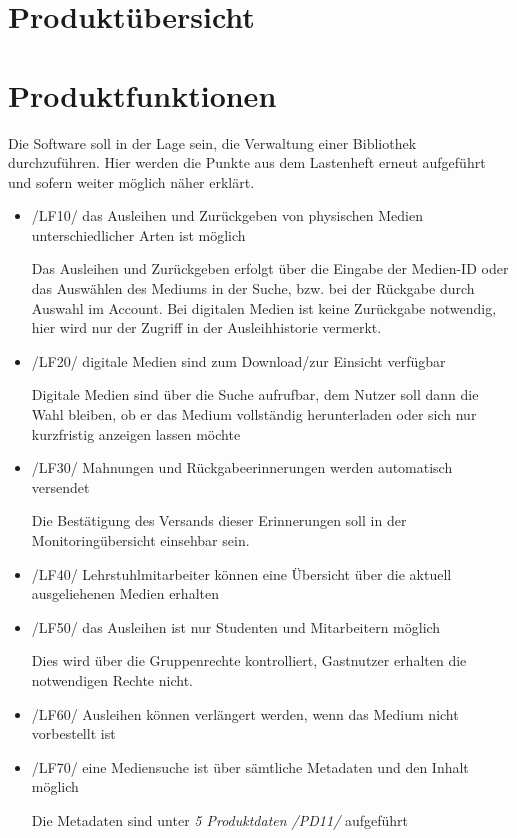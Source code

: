 \documentclass[12pt, a4paper]{article}
\begin{document}
\section{Produktübersicht}
\pagebreak

\section{Produktfunktionen}

Die Software soll in der Lage sein, die Verwaltung einer Bibliothek durchzuführen. Hier werden die Punkte aus dem Lastenheft erneut aufgeführt und sofern weiter möglich näher erklärt.
\begin{itemize}
	\item /LF10/ das Ausleihen und Zurückgeben von physischen Medien unterschiedlicher Arten ist möglich 
	
		Das Ausleihen und Zurückgeben erfolgt über die Eingabe der Medien-ID oder das Auswählen des Mediums in der Suche, bzw. bei der Rückgabe durch Auswahl im Account.
		Bei digitalen Medien ist keine Zurückgabe notwendig, hier wird nur der Zugriff in der Ausleihhistorie vermerkt.
	\item /LF20/ digitale Medien sind zum Download/zur Einsicht verfügbar 
	
	Digitale Medien sind über die Suche aufrufbar, dem Nutzer soll dann die Wahl bleiben, ob er das Medium vollständig herunterladen oder sich nur kurzfristig anzeigen lassen möchte
	\item /LF30/ Mahnungen und Rückgabeerinnerungen werden automatisch versendet 
	
	Die Bestätigung des Versands dieser Erinnerungen soll in der Monitoringübersicht einsehbar sein.
	
	\item /LF40/ Lehrstuhlmitarbeiter können eine Übersicht über die aktuell ausgeliehenen Medien erhalten 
	
	\item /LF50/ das Ausleihen ist nur Studenten und Mitarbeitern möglich 
	
	Dies wird über die Gruppenrechte kontrolliert, Gastnutzer erhalten die notwendigen Rechte nicht.
	\item /LF60/ Ausleihen können verlängert werden, wenn das Medium nicht vorbestellt ist
	\item /LF70/ eine Mediensuche ist über sämtliche Metadaten und den Inhalt möglich 
	
	Die Metadaten sind unter \textit{5 Produktdaten /PD11/} aufgeführt
\end{itemize}
\pagebreak
\end{document}

